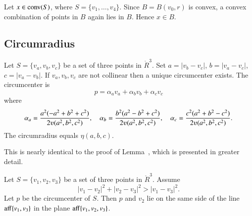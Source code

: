 \begin{tarskidata}
\begin{tarski}
\begin{proved}  Let $x\in {\operatorname{conv}}(S)$, where $S=\{v_1,\ldots,v_4\}$.
Since $B=B(v_0,r)$ is convex,  a convex combination of points in $B$
again lies in $B$.  Hence $x\in B$.
\swallowed\end{proved}
\end{tarski}










\begin{tarski}
\section{Circumradius}

\begin{lemma}
Let $S= \{v_a,v_b,v_c\}$ be a set of three points in $\ring{R}^3$.
Set $a = |v_b
- v_c|$, $b = |v_a - v_c|$, $c = |v_a  - v_b |$.  If $v_a,v_b,v_c$
are not collinear then a unique circumcenter exists.  The circumcenter is
    $$p = \alpha_a v_a + \alpha_b v_b + \alpha_c v_c$$
where
    $$%
    \alpha_a = \frac{a^2(- a^2 + b^2 + c^2)}{2\ups(a^2,b^2,c^2)},\quad
    \alpha_b = \frac{b^2(a^2 - b^2 + c^2)}{2\ups(a^2,b^2,c^2)},\quad
    \alpha_c = \frac{c^2(a^2 + b^2 - c^2)}{2\ups(a^2,b^2,c^2)}.
    $$
The circumradius equals $\eta(a,b,c)$.
\end{lemma}


\begin{proved} This is nearly identical to the proof of 
Lemma~, which is presented in greater detail.
\swallowed\end{proved}
\end{tarski}




\begin{tarski}

\begin{lemma}
Let  $S=\{v_1,v_2,v_3\}$ be a set of three points
in $\ring{R}^3$. Assume 
   $$
   |v_1-v_2|^2 + |v_2-v_3|^2 > |v_1-v_3|^2.
   $$
Let $p$ be the circumcenter of $S$.
Then $p$ and $v_2$ lie on the same side of the line ${\operatorname{aff}}\{v_1,v_3\}$
in the plane ${\operatorname{aff}}\{v_1,v_2,v_3\}$.
\end{lemma}


\end{tarski}
\end{tarskidata}
